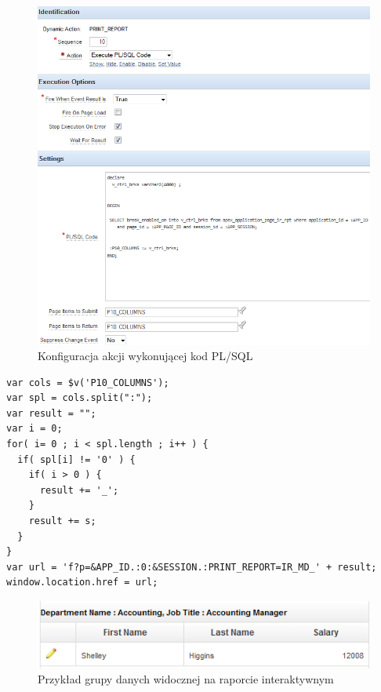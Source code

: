 \documentclass[11pt,a4paper]{article}
\begin{document}
\begin{figure}
\centering
\includegraphics[scale=0.9]{plsql_act}
\caption{Konfiguracja akcji wykonującej kod PL/SQL}
\label{img:plsqlaction}
\end{figure}

\lstset{}
\begin{lstlisting}[frame=single,caption=Kod \emph{JavaScript} wykonywany po kliknięciu na przycisk,label=printjs]
var cols = $v('P10_COLUMNS');
var spl = cols.split(":");
var result = "";
var i = 0;
for( i= 0 ; i < spl.length ; i++ ) {
  if( spl[i] != '0' ) {
    if( i > 0 ) {
      result += '_'; 
    }
    result += s;
  }
}
var url = 'f?p=&APP_ID.:0:&SESSION.:PRINT_REPORT=IR_MD_' + result; 
window.location.href = url;

\end{lstlisting}



\begin{figure}[h]
\centering
\includegraphics[scale=0.8]{final_screen}
\caption{Przykład grupy danych widocznej na raporcie interaktywnym}
\label{img:final}
\end{figure}
\end{document}
